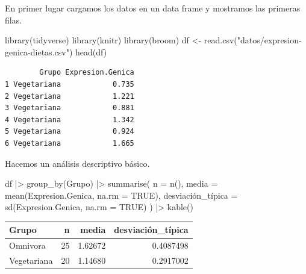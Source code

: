 \documentclass[
  a4paper,
]{scrreport}
\newenvironment{Shaded}{\begin{snugshade}}{\end{snugshade}}
\newcommand{\AttributeTok}[1]{\textcolor[rgb]{0.40,0.45,0.13}{#1}}
\newcommand{\ConstantTok}[1]{\textcolor[rgb]{0.56,0.35,0.01}{#1}}
\newcommand{\FunctionTok}[1]{\textcolor[rgb]{0.28,0.35,0.67}{#1}}
\newcommand{\NormalTok}[1]{\textcolor[rgb]{0.00,0.23,0.31}{#1}}
\newcommand{\OtherTok}[1]{\textcolor[rgb]{0.00,0.23,0.31}{#1}}
\newcommand{\SpecialCharTok}[1]{\textcolor[rgb]{0.37,0.37,0.37}{#1}}
\newcommand{\StringTok}[1]{\textcolor[rgb]{0.13,0.47,0.30}{#1}}
\theoremstyle{definition}
\theoremstyle{remark}
\begin{document}
\begin{tcolorbox}[enhanced jigsaw, breakable, opacityback=0, colbacktitle=quarto-callout-tip-color!10!white, colframe=quarto-callout-tip-color-frame, left=2mm, titlerule=0mm, coltitle=black, colback=white, bottomtitle=1mm, toptitle=1mm, opacitybacktitle=0.6, title=\textcolor{quarto-callout-tip-color}{\faLightbulb}\hspace{0.5em}{Solución}, leftrule=.75mm, bottomrule=.15mm, toprule=.15mm, rightrule=.15mm, arc=.35mm]

En primer lugar cargamos los datos en un data frame y mostramos las
primeras filas.

\begin{Shaded}
\begin{Highlighting}[]
\FunctionTok{library}\NormalTok{(tidyverse)}
\FunctionTok{library}\NormalTok{(knitr)}
\FunctionTok{library}\NormalTok{(broom)}
\NormalTok{df }\OtherTok{\textless{}{-}} \FunctionTok{read.csv}\NormalTok{(}\StringTok{"datos/expresion{-}genica{-}dietas.csv"}\NormalTok{)}
\FunctionTok{head}\NormalTok{(df)}
\end{Highlighting}
\end{Shaded}

\begin{verbatim}
        Grupo Expresion.Genica
1 Vegetariana            0.735
2 Vegetariana            1.221
3 Vegetariana            0.881
4 Vegetariana            1.342
5 Vegetariana            0.924
6 Vegetariana            1.665
\end{verbatim}

Hacemos un análisis descriptivo básico.

\begin{Shaded}
\begin{Highlighting}[]
\NormalTok{df }\SpecialCharTok{|\textgreater{}} 
    \FunctionTok{group\_by}\NormalTok{(Grupo) }\SpecialCharTok{|\textgreater{}} 
    \FunctionTok{summarise}\NormalTok{(}
        \AttributeTok{n =} \FunctionTok{n}\NormalTok{(),}
        \AttributeTok{media =} \FunctionTok{mean}\NormalTok{(Expresion.Genica, }\AttributeTok{na.rm =} \ConstantTok{TRUE}\NormalTok{),}
\NormalTok{        desviación\_típica }\OtherTok{=} \FunctionTok{sd}\NormalTok{(Expresion.Genica, }\AttributeTok{na.rm =} \ConstantTok{TRUE}\NormalTok{)}
\NormalTok{    ) }\SpecialCharTok{|\textgreater{}} 
    \FunctionTok{kable}\NormalTok{()}
\end{Highlighting}
\end{Shaded}

\begin{longtable}[]{@{}lrrr@{}}
\toprule\noalign{}
Grupo & n & media & desviación\_típica \\
\midrule\noalign{}
\endhead
\bottomrule\noalign{}
\endlastfoot
Omnivora & 25 & 1.62672 & 0.4087498 \\
Vegetariana & 20 & 1.14680 & 0.2917002 \\
\end{longtable}


\end{tcolorbox}
\end{document}
